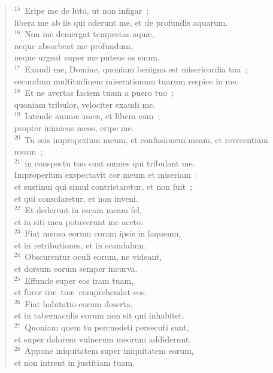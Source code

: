 \begin{verse}
${}^{15}$~Eripe me de luto, ut non infigar~;\\ libera me ab iis qui oderunt me, et de profundis aquarum.\\
${}^{16}$~Non me demergat tempestas aqu\ae ,\\ neque absorbeat me profundum,\\ neque urgeat super me puteus os suum.\\
${}^{17}$~Exaudi me, Domine, quoniam benigna est misericordia tua~;\\ secundum multitudinem miserationum tuarum respice in me.\\
${}^{18}$~Et ne avertas faciem tuam a puero tuo~;\\ quoniam tribulor, velociter exaudi me.\\
${}^{19}$~Intende anim\ae\ me\ae , et libera eam~;\\ propter inimicos meos, eripe me.\\
${}^{20}$~Tu scis improperium meum, et confusionem meam, et reverentiam meam~;\\
${}^{21}$~in conspectu tuo sunt omnes qui tribulant me.\\ Improperium exspectavit cor meum et miseriam~:\\ et sustinui qui simul contristaretur, et non fuit~;\\ et qui consolaretur, et non inveni.\\
${}^{22}$~Et dederunt in escam meam fel,\\ et in siti mea potaverunt me aceto.\\
${}^{23}$~Fiat mensa eorum coram ipsis in laqueum,\\ et in retributiones, et in scandalum.\\
${}^{24}$~Obscurentur oculi eorum, ne videant,\\ et dorsum eorum semper incurva.\\
${}^{25}$~Effunde super eos iram tuam,\\ et furor ir\ae\ tu\ae\ comprehendat eos.\\
${}^{26}$~Fiat habitatio eorum deserta,\\ et in tabernaculis eorum non sit qui inhabitet.\\
${}^{27}$~Quoniam quem tu percussisti persecuti sunt,\\ et super dolorem vulnerum meorum addiderunt.\\
${}^{28}$~Appone iniquitatem super iniquitatem eorum,\\ et non intrent in justitiam tuam.\\

\end{verse}
